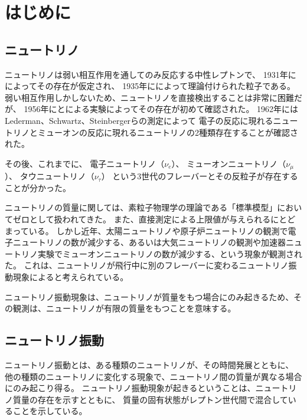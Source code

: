 \chapter{はじめに}

\section{ニュートリノ}

ニュートリノは弱い相互作用を通してのみ反応する中性レプトンで、
1931年にによってその存在が仮定され、
1935年にによって理論付けられた粒子である。
弱い相互作用しかしないため、ニュートリノを直接検出することは非常に困難だが、
1956年にとによる実験によってその存在が初めて確認された。
1962年にはLederman、Schwartz、Steinbergerらの測定によって
電子の反応に現れるニュートリノとミューオンの反応に現れるニュートリノの2種類存在することが確認された。

その後、これまでに、
電子ニュートリノ（$\nu_{e}$）、
ミューオンニュートリノ（$\nu_{\mu}$）、
タウニュートリノ（$\nu_{\tau}$）
という3世代のフレーバーとその反粒子が存在することが分かった。

ニュートリノの質量に関しては、素粒子物理学の理論である「標準模型」においてゼロとして扱われてきた。
また、直接測定による上限値が与えられるにとどまっている。
しかし近年、太陽ニュートリノや原子炉ニュートリノの観測で電子ニュートリノの数が減少する、あるいは大気ニュートリノの観測や加速器ニュートリノ実験でミューオンニュートリノの数が減少する、という現象が観測された。
これは、ニュートリノが飛行中に別のフレーバーに変わるニュートリノ振動現象によると考えられている。

ニュートリノ振動現象は、ニュートリノが質量をもつ場合にのみ起きるため、その観測は、ニュートリノが有限の質量をもつことを意味する。


\section{ニュートリノ振動}

ニュートリノ振動とは、ある種類のニュートリノが、その時間発展とともに、
他の種類のニュートリノに変化する現象で、ニュートリノ間の質量が異なる場合にのみ起こり得る。
ニュートリノ振動現象が起きるということは、ニュートリノ質量の存在を示すとともに、
質量の固有状態がレプトン世代間で混合していることを示している。

